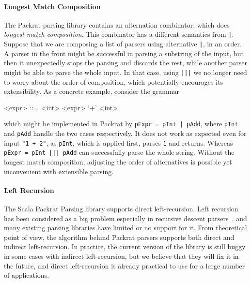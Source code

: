 \paragraph{Longest Match Composition} The Packrat parsing library
contains an alternation combinator, which does \emph{longest match
  composition}. This combinator has a different semantics from
\lstinline{|}.
Suppose that we are composing a list of parsers using alternative
\lstinline{|}, in an order. A parser in the front might be successful
in parsing a substring of the input, but then it unexpectedly stops
the parsing and discards the rest, while another parser might be able
to parse the whole input. In that case, using \lstinline{|||} we no
longer need to worry about the order of composition, which potentially
encourages its extensibility. As a concrete example, consider the grammar
\begin{grammar}
<expr> ::= <int> \alt <expr> `+' <int>
\end{grammar}
which might be implemented in Packrat by \lstinline{pExpr = pInt | pAdd}, where \lstinline{pInt}
and \lstinline{pAdd} handle the two cases respectively. It does not work as expected even for input \lstinline{"1 + 2"},
as \lstinline{pInt}, which is applied first, parses \lstinline{1} and returns. Whereas \lstinline{pExpr = pInt ||| pAdd}
can successfully parse the whole string. Without the longest match composition, adjusting the order of alternatives is possible
yet inconvenient with extensible parsing.


\paragraph{Left Recursion} The Scala Packrat Parsing library
supports direct left-recursion. Left recursion has been considered
as a big problem especially in recursive descent parsers~\cite{}, and many
existing parsing libraries have limited or no support for it. From theoretical point of
view, the algorithm behind Packrat parsers supports both direct and
indirect left-recursion. In practice, the current version of the library is still
buggy in some cases with indirect left-recursion, but we believe that
they will fix it in the future, and direct left-recursion is
already practical to use for a large number of applications.
